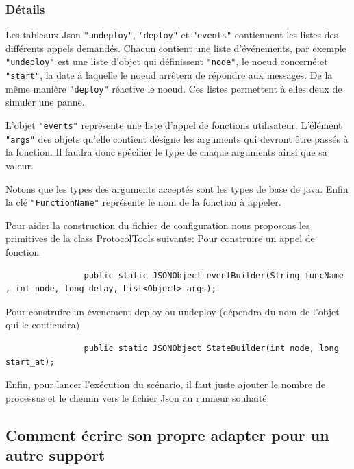 \documentclass{article}
\begin{document}
			\subsubsection{Détails}
			Les tableaux Json \lstinline{"undeploy"}, \lstinline{"deploy"} et \lstinline{"events"} contiennent
			les listes des différents appels demandés.
			Chacun contient une liste d'événements, par exemple \lstinline{"undeploy"} est une liste
			d'objet qui définissent \lstinline{"node"}, le noeud concerné et \lstinline{"start"}, la
			date à laquelle le noeud arrêtera de répondre aux messages.
			De la même manière \lstinline{"deploy"} réactive le noeud. Ces listes permettent à elles
			deux de simuler une panne.
			\bigskip

			L'objet \lstinline{"events"} représente une liste d'appel de fonctions utilisateur.
			L'élément \lstinline{"args"} des objets qu'elle contient désigne les arguments qui
			devront être passés à la fonction. Il faudra donc spécifier le type de chaque arguments
			ainsi que sa valeur.

			Notons que les types des arguments acceptés sont les types de base de java.
			Enfin la clé \lstinline{"FunctionName"} représente le nom de la fonction à appeler.
			\bigskip

			Pour aider la construction du fichier de configuration nous proposons les primitives de la class ProtocolTools suivante:
			\newline
			Pour construire un appel de fonction
			\begin{lstlisting}
				public static JSONObject eventBuilder(String funcName , int node, long delay, List<Object> args);
			\end{lstlisting}
			Pour construire un évenement deploy ou undeploy 
			\newline
			(dépendra du nom de l'objet qui le contiendra)
			\begin{lstlisting}
				public static JSONObject StateBuilder(int node, long start_at);
			\end{lstlisting}

			Enfin, pour lancer l'exécution du scénario, il faut juste ajouter le nombre de processus et le chemin vers le fichier Json au runneur souhaité.
		\newpage		
		\subsection{Comment écrire son propre adapter pour un autre support}

		
\end{document}
